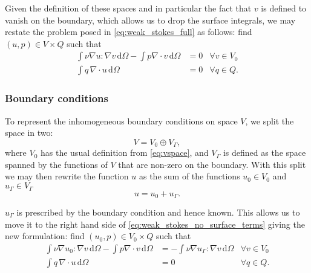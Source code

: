 \documentclass[thesis]{subfiles}
\begin{document}
Given the definition of these spaces and in particular the fact that $v$ is defined to vanish on the boundary, which allows us to drop the surface integrals, we may restate the problem posed in \cref{eq:weak_stokes_full} as follows: find $(u, p) \in V \times Q$ such that
\begin{equation} \label{eq:weak_stokes_no_surface_terms}
  \begin{aligned}
    \int \nu \nabla u : \nabla v \, \textrm{d}\Omega
    - \int p \nabla \cdot v \, \textrm{d}\Omega
    &= 0
    &\forall v \in V_0 \\
    \int q \, \nabla \cdot u \, \textrm{d}\Omega
    &= 0
    &\forall q \in Q.
  \end{aligned}
\end{equation}

\subsubsection{Boundary conditions}

To represent the inhomogeneous boundary conditions on space $V$, we split the space in two:
\begin{equation}
  V = V_0 \oplus V_\Gamma,
\end{equation}
where $V_0$ has the usual definition from \cref{eq:vspace}, and $V_\Gamma$ is defined as the space spanned by the functions of $V$ that are non-zero on the boundary.
With this split we may then rewrite the function $u$ as the sum of the functions $u_0 \in V_0$ and $u_\Gamma \in V_\Gamma$
\begin{equation}
  u = u_0 + u_\Gamma.
\end{equation}

$u_\Gamma$ is prescribed by the boundary condition and hence known.
This allows us to move it to the right hand side of \cref{eq:weak_stokes_no_surface_terms} giving the new formulation: find $(u_0, p) \in V_0 \times Q$ such that
\begin{equation} \label{eq:weak_stokes}
  \begin{aligned}
    \int \nu \nabla u_0 : \nabla v \, \textrm{d}\Omega
    - \int p \nabla \cdot v \, \textrm{d}\Omega
    &=
    - \int \nu \nabla u_\Gamma : \nabla v \, \textrm{d}\Omega
    &\forall v \in V_0 \\
    \int q \, \nabla \cdot u \, \textrm{d}\Omega
    &= 0
    &\forall q \in Q.
  \end{aligned}
\end{equation}
\end{document}
